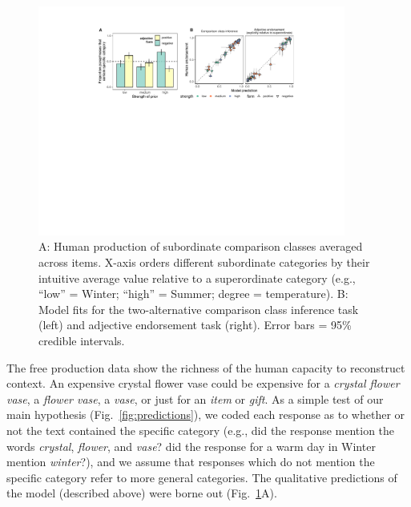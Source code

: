 \documentclass[letterpaper, 12pt]{article}
\begin{document}
\begin{figure}[t]
  \begin{center}
    \includegraphics[width=0.9\textwidth]{bars_scatters}
  \end{center}
  \vspace{-0.55cm}
  \caption{\small  A: Human production of subordinate comparison classes averaged across items. X-axis orders different subordinate categories by their intuitive average value relative to a superordinate category 
  (e.g., ``low'' = Winter; ``high'' = Summer; degree = temperature).
  B: Model fits for the two-alternative comparison class inference task (left) and adjective endorsement task (right). Error bars = 95\% credible intervals.}
  \label{fig:results}
    \vspace{-0.55cm}
\end{figure}


The free production data show the richness of the human capacity to reconstruct context.
An expensive crystal flower vase could be expensive for a \emph{crystal flower vase}, a \emph{flower vase}, a \emph{vase}, or just for an \emph{item} or \emph{gift}. 
As a simple test of our main hypothesis (Fig.~\ref{fig:predictions}), we coded each response as to whether or not the text contained the specific category (e.g., did the response mention the words \emph{crystal}, \emph{flower}, and \emph{vase}? did the response for a warm day in Winter mention \emph{winter}?), and we assume that responses which do not mention the specific  category refer to more general categories.
The qualitative predictions of the model (described above) were borne out (Fig.~\ref{fig:results}A).
\end{document}
